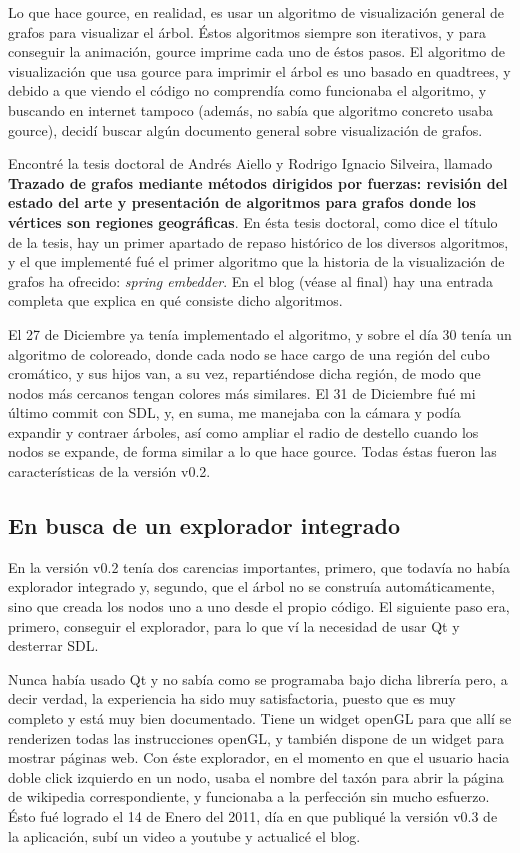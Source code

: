 Lo que hace gource, en realidad, es usar un algoritmo de visualización
general de grafos para visualizar el árbol. Éstos algoritmos siempre
son iterativos, y para conseguir la animación, gource imprime cada uno
de éstos pasos. El algoritmo de visualización que usa gource para
imprimir el árbol es uno basado en quadtrees, y debido a que viendo el
código no comprendía como funcionaba el algoritmo, y buscando en
internet tampoco (además, no sabía que algoritmo concreto usaba
gource), decidí buscar algún documento general sobre visualización de
grafos.

Encontré la tesis doctoral de Andrés Aiello y Rodrigo Ignacio
Silveira, llamado \textbf{Trazado de grafos mediante métodos dirigidos
  por fuerzas: revisión del estado del arte y presentación de
  algoritmos para grafos donde los vértices son regiones
  geográficas}. En ésta tesis doctoral, como dice el título de la
tesis, hay un primer apartado de repaso histórico de los diversos
algoritmos, y el que implementé fué el primer algoritmo que la
historia de la visualización de grafos ha ofrecido: \textit{spring
  embedder}. En el blog (véase al final) hay una entrada completa que
explica en qué consiste dicho algoritmos.

El 27 de Diciembre ya tenía implementado el algoritmo, y sobre el día
30 tenía un algoritmo de coloreado, donde cada nodo se hace cargo de
una región del cubo cromático, y sus hijos van, a su vez,
repartiéndose dicha región, de modo que nodos más cercanos tengan
colores más similares. El 31 de Diciembre fué mi último commit con
SDL, y, en suma, me manejaba con la cámara y podía expandir y contraer
árboles, así como ampliar el radio de destello cuando los nodos se
expande, de forma similar a lo que hace gource. Todas éstas fueron las
características de la versión v0.2.

\subsection{En busca de un explorador integrado}
En la versión v0.2 tenía dos carencias importantes, primero, que
todavía no había explorador integrado y, segundo, que el árbol no se
construía automáticamente, sino que creada los nodos uno a uno desde
el propio código. El siguiente paso era, primero, conseguir el
explorador, para lo que ví la necesidad de usar Qt y desterrar SDL.

Nunca había usado Qt y no sabía como se programaba bajo dicha librería
pero, a decir verdad, la experiencia ha sido muy satisfactoria, puesto
que es muy completo y está muy bien documentado. Tiene un widget
openGL para que allí se renderizen todas las instrucciones openGL, y
también dispone de un widget para mostrar páginas web. Con éste
explorador, en el momento en que el usuario hacia doble click
izquierdo en un nodo, usaba el nombre del taxón para abrir la página
de wikipedia correspondiente, y funcionaba a la perfección sin mucho
esfuerzo. Ésto fué logrado el 14 de Enero del 2011, día en que
publiqué la versión v0.3 de la aplicación, subí un video a youtube y
actualicé el blog.

